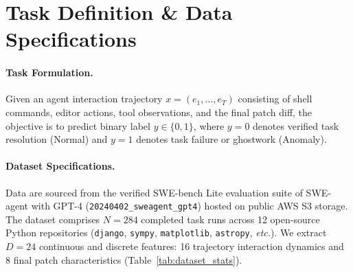 \documentclass[11pt]{article}
\begin{document}
\section{Task Definition \& Data Specifications}
\paragraph{Task Formulation.}
Given an agent interaction trajectory $x = (e_1, \dots, e_T)$ consisting of shell commands, editor actions, tool observations, and the final patch diff, the objective is to predict binary label $y \in \{0, 1\}$, where $y=0$ denotes verified task resolution (Normal) and $y=1$ denotes task failure or ghostwork (Anomaly).

\paragraph{Dataset Specifications.}
Data are sourced from the verified SWE-bench Lite evaluation suite of SWE-agent with GPT-4 (\texttt{20240402\_sweagent\_gpt4}) hosted on public AWS S3 storage. The dataset comprises $N=284$ completed task runs across 12 open-source Python repositories (\texttt{django}, \texttt{sympy}, \texttt{matplotlib}, \texttt{astropy}, \textit{etc.}). We extract $D=24$ continuous and discrete features: 16 trajectory interaction dynamics and 8 final patch characteristics (Table~\ref{tab:dataset_stats}).
\end{document}
